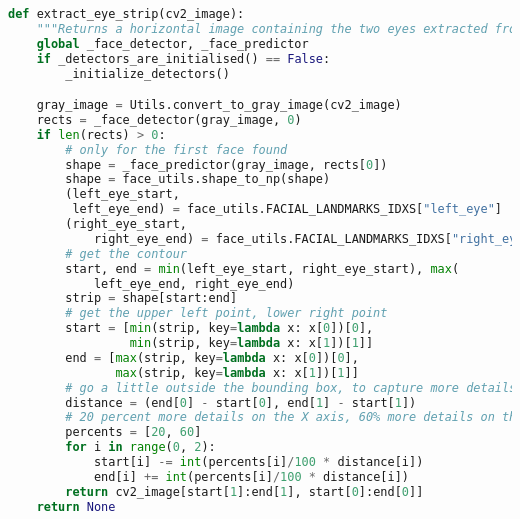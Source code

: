 \begin{lstlisting}[language=Python, caption=Extragerea ``bandei oculare'' în Python 3.7]
def extract_eye_strip(cv2_image):
    """Returns a horizontal image containing the two eyes extracted from the image"""
    global _face_detector, _face_predictor
    if _detectors_are_initialised() == False:
        _initialize_detectors()

    gray_image = Utils.convert_to_gray_image(cv2_image)
    rects = _face_detector(gray_image, 0)
    if len(rects) > 0:
        # only for the first face found
        shape = _face_predictor(gray_image, rects[0])
        shape = face_utils.shape_to_np(shape)
        (left_eye_start,
         left_eye_end) = face_utils.FACIAL_LANDMARKS_IDXS["left_eye"]
        (right_eye_start,
            right_eye_end) = face_utils.FACIAL_LANDMARKS_IDXS["right_eye"]
        # get the contour
        start, end = min(left_eye_start, right_eye_start), max(
            left_eye_end, right_eye_end)
        strip = shape[start:end]
        # get the upper left point, lower right point
        start = [min(strip, key=lambda x: x[0])[0],
                 min(strip, key=lambda x: x[1])[1]]
        end = [max(strip, key=lambda x: x[0])[0],
               max(strip, key=lambda x: x[1])[1]]
        # go a little outside the bounding box, to capture more details
        distance = (end[0] - start[0], end[1] - start[1])
        # 20 percent more details on the X axis, 60% more details on the Y axis
        percents = [20, 60]
        for i in range(0, 2):
            start[i] -= int(percents[i]/100 * distance[i])
            end[i] += int(percents[i]/100 * distance[i])
        return cv2_image[start[1]:end[1], start[0]:end[0]]
    return None

\end{lstlisting}